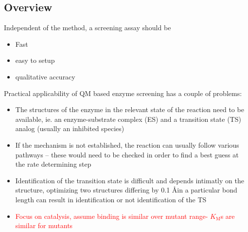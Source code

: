 \subsection{Overview}\label{sec:overview}
Independent of the method, a screening assay should be
\begin{itemize}
\item Fast
\item easy to setup
\item qualitative accuracy
\end{itemize}
Practical applicability of QM based enzyme screening has a couple of problems:
\begin{itemize}
\item The structures of the enzyme in the relevant state of the reaction need to be available, ie. an enzyme-substrate complex (ES) and a transition state (TS) analog (usually an inhibited species)
\item If the mechanism is not established, the reaction can usually follow various pathways -- these would need to be checked in order to find a best guess at the rate determining step
\item Identification of the transition state is difficult and depends intimatly on the structure, optimizing two structures differing by 0.1 \AA in a particular bond length can result in identification or not identification of the TS
\item \textcolor{red}{Focus on catalysis, assume binding is similar over mutant range\cite{ludwiczek2013strategies}- $K_\text{M}$s are similar for mutants}
\end{itemize}

\clearpage
